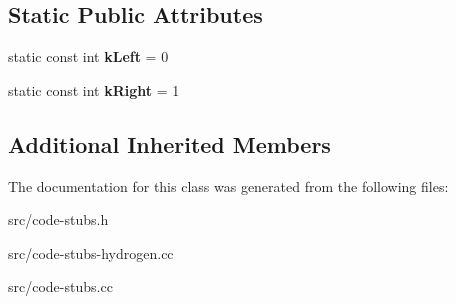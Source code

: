 \subsection*{Static Public Attributes}
\begin{DoxyCompactItemize}
\item 
\hypertarget{classv8_1_1internal_1_1_binary_op_i_c_stub_a4b6bc058ea73c9f688e388a9a381809a}{}static const int {\bfseries k\+Left} = 0\label{classv8_1_1internal_1_1_binary_op_i_c_stub_a4b6bc058ea73c9f688e388a9a381809a}

\item 
\hypertarget{classv8_1_1internal_1_1_binary_op_i_c_stub_a1eacdcdd63ace6ece659bba90fe9119c}{}static const int {\bfseries k\+Right} = 1\label{classv8_1_1internal_1_1_binary_op_i_c_stub_a1eacdcdd63ace6ece659bba90fe9119c}

\end{DoxyCompactItemize}
\subsection*{Additional Inherited Members}


The documentation for this class was generated from the following files\+:\begin{DoxyCompactItemize}
\item 
src/code-\/stubs.\+h\item 
src/code-\/stubs-\/hydrogen.\+cc\item 
src/code-\/stubs.\+cc\end{DoxyCompactItemize}
